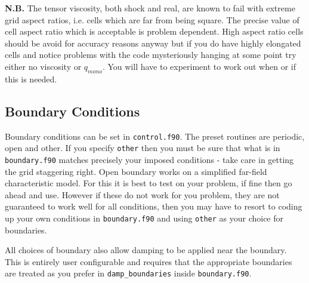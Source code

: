 \documentclass[11pt]{article}
\begin{document}
{\bf N.B.} The tensor viscosity, both shock and real, are known to fail with extreme grid aspect ratios, i.e. cells which are far from being square. The precise value of cell aspect ratio which is acceptable is problem dependent. High aspect ratio cells should be avoid for accuracy reasons anyway but if you do have highly elongated cells and notice problems with the code mysteriously hanging at some point try either no viscosity or $q_{mono}$. You will have to experiment to work out when or if this is needed.

\subsection{Boundary Conditions}
Boundary conditions can be set in {\tt control.f90}. The preset routines are periodic, open and other. If you specify {\tt other} then you must be sure that what is in {\tt boundary.f90} matches precisely your imposed conditions - take care in getting the grid staggering right. Open boundary works on a simplified far-field characteristic model. For this it is best to test on your problem, if fine then go ahead and use. However if these do not work for you problem, they are not guaranteed to work well for all conditions, then you may have to resort to coding up your own conditions in {\tt boundary.f90} and using {\tt other} as your choice for boundaries.

All choices of boundary also allow damping to be applied near the boundary. This is entirely user configurable and requires that the appropriate boundaries are treated as you prefer in {\tt damp\_boundaries} inside {\tt boundary.f90}.
\end{document}
